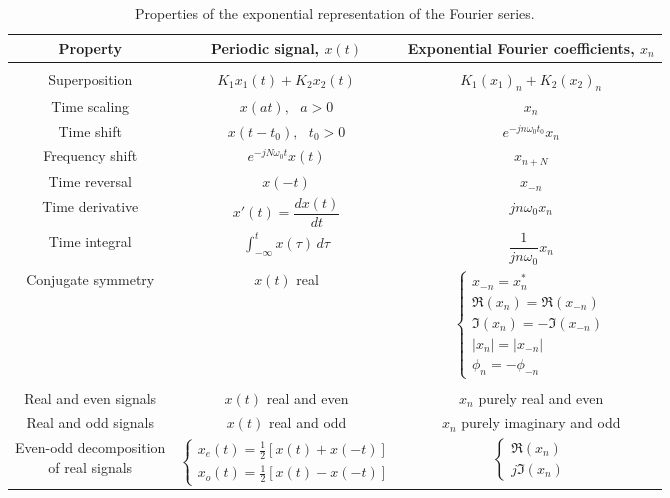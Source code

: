 \documentclass{report}
\begin{document}
\begin{table}[hbt!]
    \centering
    \caption{Properties of the exponential representation of the Fourier series.}
    \label{series_prop}
    \begin{tabular}{|c|c|c|}
        \hline
        Property & Periodic signal, $x(t)$ & Exponential Fourier coefficients, $x_n$ \\[0.15cm]
        \hline
        & & \\
        Superposition & $K_1x_1(t)+K_2x_2(t)$ & $K_1(x_1)_n+K_2(x_2)_n$ \\[0.5cm]
        Time scaling & $x(at),\text{ } a>0$ & $x_n$ \\[0.5cm]
        Time shift & $x(t-t_0),\text{ } t_0>0$ & $e^{-jn\omega_0 t_0}x_n$ \\[0.5cm]
        Frequency shift & $e^{-jN\omega_0 t}x(t)$ & $x_{n+N}$ \\[0.5cm]
        Time reversal & $x(-t)$ & $x_{-n}$ \\[0.5cm]
        Time derivative & $x'(t)=\dfrac{dx(t)}{dt}$ & $jn\omega_0 x_n$ \\[0.5cm]
        Time integral & $\displaystyle\int_{-\infty}^{t} x(\tau) \,d\tau$ & $\dfrac{1}{jn\omega_0} x_n$ \\[0.5cm]
        Conjugate symmetry & $x(t)$ real & 
        $\begin{cases}
            x_{-n} = x_n^* \\
            \Re(x_n) = \Re(x_{-n}) \\
            \Im(x_n) = -\Im(x_{-n}) \\
            |x_n| = |x_{-n}| \\
            \phi_n = -\phi_{-n}
        \end{cases}$ \\[0.5cm]
         & & \\[0.25cm]
        Real and even signals & $x(t)$ real and even & $x_n$ purely real and even \\[0.5cm]
        Real and odd signals & $x(t)$ real and odd & $x_n$ purely imaginary and odd \\[0.5cm]
        \shortstack{Even-odd decomposition \\ of real signals} & 
        $\begin{cases}
            x_e(t)=\frac{1}{2}[x(t)+x(-t)] \\
            x_o(t)=\frac{1}{2}[x(t)-x(-t)]
        \end{cases}$ & 
        $\begin{cases}
            \Re(x_n) \\
            j\Im(x_n)
        \end{cases}$ \\[0.5cm]
        \hline
    \end{tabular}
\end{table}
\end{document}
